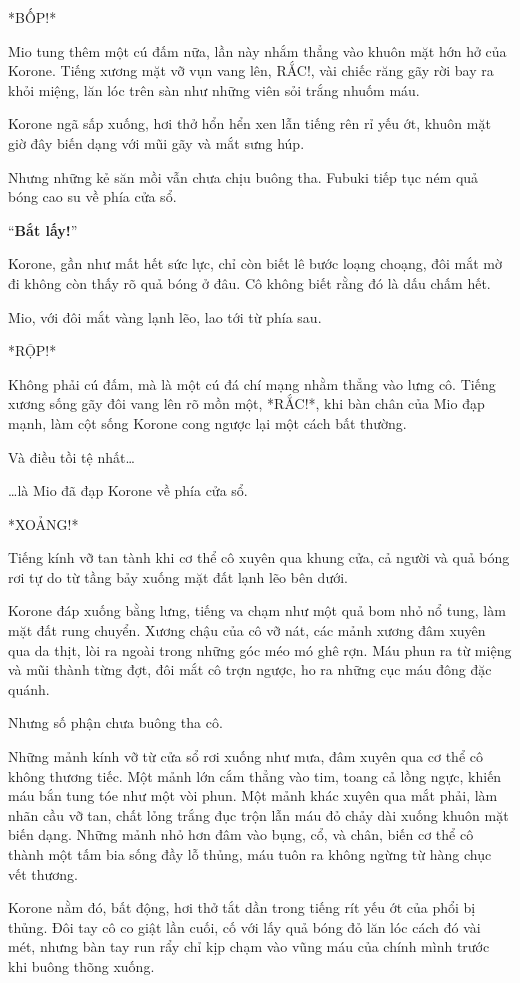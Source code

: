 \documentclass[../main.tex]{subfiles}
\begin{document}
*BỐP!*

Mio tung thêm một cú đấm nữa, lần này nhắm thẳng vào khuôn mặt hớn hở của Korone. Tiếng xương mặt vỡ vụn vang lên, RẮC!, vài chiếc răng gãy rời bay ra khỏi miệng, lăn lóc trên sàn như những viên sỏi trắng nhuốm máu.

Korone ngã sấp xuống, hơi thở hổn hển xen lẫn tiếng rên rỉ yếu ớt, khuôn mặt giờ đây biến dạng với mũi gãy và mắt sưng húp.

Nhưng những kẻ săn mồi vẫn chưa chịu buông tha. Fubuki tiếp tục ném quả bóng cao su về phía cửa sổ.

``\textbf{Bắt lấy!}''

Korone, gần như mất hết sức lực, chỉ còn biết lê bước loạng choạng, đôi mắt mờ đi không còn thấy rõ quả bóng ở đâu. Cô không biết rằng đó là dấu chấm hết.

Mio, với đôi mắt vàng lạnh lẽo, lao tới từ phía sau.

*RỘP!*

Không phải cú đấm, mà là một cú đá chí mạng nhằm thẳng vào lưng cô. Tiếng xương sống gãy đôi vang lên rõ mồn một, *RẮC!*, khi bàn chân của Mio đạp mạnh, làm cột sống Korone cong ngược lại một cách bất thường.

Và điều tồi tệ nhất\dots

\dots là Mio đã đạp Korone về phía cửa sổ.

*XOẢNG!*

Tiếng kính vỡ tan tành khi cơ thể cô xuyên qua khung cửa, cả người và quả bóng rơi tự do từ tầng bảy xuống mặt đất lạnh lẽo bên dưới.

Korone đáp xuống bằng lưng, tiếng va chạm như một quả bom nhỏ nổ tung, làm mặt đất rung chuyển. Xương chậu của cô vỡ nát, các mảnh xương đâm xuyên qua da thịt, lòi ra ngoài trong những góc méo mó ghê rợn. Máu phun ra từ miệng và mũi thành từng đợt, đôi mắt cô trợn ngược, ho ra những cục máu đông đặc quánh.

Nhưng số phận chưa buông tha cô.

Những mảnh kính vỡ từ cửa sổ rơi xuống như mưa, đâm xuyên qua cơ thể cô không thương tiếc. Một mảnh lớn cắm thẳng vào tim, toang cả lồng ngực, khiến máu bắn tung tóe như một vòi phun. Một mảnh khác xuyên qua mắt phải, làm nhãn cầu vỡ tan, chất lỏng trắng đục trộn lẫn máu đỏ chảy dài xuống khuôn mặt biến dạng. Những mảnh nhỏ hơn đâm vào bụng, cổ, và chân, biến cơ thể cô thành một tấm bia sống đầy lỗ thủng, máu tuôn ra không ngừng từ hàng chục vết thương.

Korone nằm đó, bất động, hơi thở tắt dần trong tiếng rít yếu ớt của phổi bị thủng. Đôi tay cô co giật lần cuối, cố với lấy quả bóng đỏ lăn lóc cách đó vài mét, nhưng bàn tay run rẩy chỉ kịp chạm vào vũng máu của chính mình trước khi buông thõng xuống.
\end{document}
